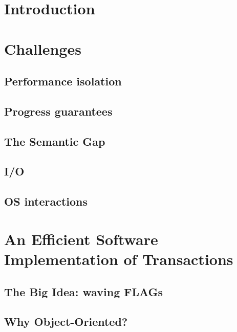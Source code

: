 \documentclass{phd-thesis}
\author{C. Scott Ananian}
\title{\subtitle}
\date{\subdate \\ $ $Revision: 1.10 $ $}
\begin{document}

\frontmatter


\mainmatter
\chapter{Introduction}


\chapter{Challenges}
\section{Performance isolation}
\section{Progress guarantees}\label{sec:progress}
\section{The Semantic Gap}
\section{I/O}
\section{OS interactions}

\chapter[Efficient Software Implementation]{An Efficient Software Implementation of Transactions}
\section{The Big Idea: waving FLAGs}
\section{Why Object-Oriented?} %
\end{document}
